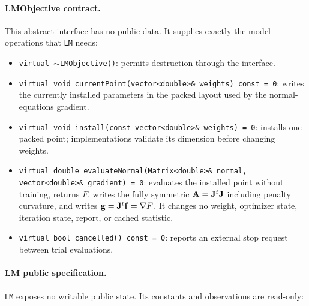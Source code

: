 \paragraph{LMObjective contract.}  This abstract interface has no public data.
It supplies exactly the model operations that \texttt{LM} needs:

\begin{itemize}
\item \texttt{virtual $\sim$LMObjective()}: permits destruction through the
      interface.
\item \texttt{virtual void currentPoint(vector<double>\& weights) const = 0}:
      writes the currently installed parameters in the packed layout used by
      the normal-equations gradient.
\item \texttt{virtual void install(const vector<double>\& weights) = 0}:
      installs one packed point; implementations validate its dimension before
      changing weights.
\item \texttt{virtual double evaluateNormal(Matrix<double>\& normal,
      vector<double>\& gradient) = 0}: evaluates the installed point without
      training, returns $F$, writes the fully symmetric
      ${\bf A}={\bf J}^t{\bf J}$ including penalty curvature, and writes
      ${\bf g}={\bf J}^t{\bf f}=\nabla F$. It changes no weight, optimizer
      state, iteration state, report, or cached statistic.
\item \texttt{virtual bool cancelled() const = 0}: reports an external stop
      request between trial evaluations.
\end{itemize}

\paragraph{LM public specification.}  \texttt{LM} exposes no writable public
state. Its constants and observations are read-only:

